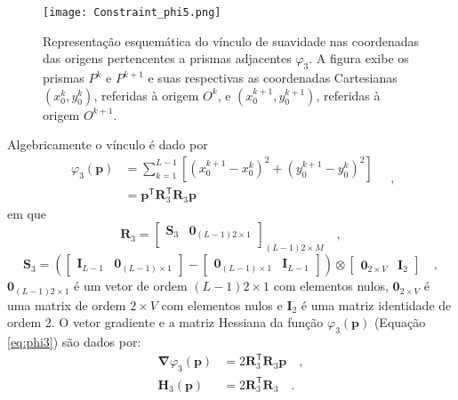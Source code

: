 \begin{figure}[!htb]
	\centering
	\texttt{[image: Constraint\_phi5.png]}
	\caption{Representação esquemática do vínculo de suavidade nas coordenadas das origens pertencentes a prismas adjacentes $\varphi_{3}$. A figura exibe os prismas $P^k$ e $P^{k+1}$ e suas respectivas as coordenadas Cartesianas $(x_0^k,y_0^k)$, referidas à origem $O^k$, e $(x_0^{k+1},y_0^{k+1})$, referidas à origem $O^{k+1}$.}
	\label{fig:phi3}
\end{figure}

Algebricamente o vínculo é dado por
\begin{equation}\label{eq:phi3}
\begin{split}
\varphi_{3}(\mathbf{p}) &= \sum\limits^{L-1}_{k=1}\left[\left(x_{0}^{k+1} - x_{0}^{k}\right)^2 + \left(y_{0}^{k+1} - y_{0}^{k}\right)^2 \right] \\
&= \mathbf{p}^{\mathsf{T}} \mathbf{R}^{\mathsf{T}}_{3}\mathbf{R}_{3}\mathbf{p}
\end{split} \quad ,
\end{equation}
em que 
\begin{equation}
\mathbf{R}_{3} = 
\begin{bmatrix}
\mathbf{S}_{3} & \mathbf{0}_{(L-1)2 \times 1} \\
\end{bmatrix}_{(L-1)2 \times M} \quad ,
\label{eq:R3-matrix}
\end{equation}
\begin{equation}
\mathbf{S}_{3} =
\left( 
\begin{bmatrix} \mathbf{I}_{L-1} & \mathbf{0}_{(L-1) \times 1} \end{bmatrix} -
\begin{bmatrix} \mathbf{0}_{(L-1) \times 1} & \mathbf{I}_{L-1} \end{bmatrix} 
\right) \otimes 
\begin{bmatrix} \mathbf{0}_{2 \times V} & \mathbf{I}_{2} \end{bmatrix} \quad ,
\label{eq:S3-matrix}
\end{equation}
$\mathbf{0}_{(L-1)2 \times 1}$ é um vetor de ordem $(L-1)2 \times 1$ com elementos nulos,
$\mathbf{0}_{2 \times V}$ é uma matrix de ordem $2 \times V$ com elementos nulos e 
$\mathbf{I}_{2}$ é uma matriz identidade de ordem $2$. O vetor gradiente e a matriz Hessiana da função $\varphi_{3}(\mathbf{p})$ (Equação \ref{eq:phi3}) são dados por:
\begin{equation}\label{eq:phi3_gh}
\begin{split}
\boldsymbol{\nabla}\varphi_{3}(\mathbf{p}) &= 2\mathbf{R}^\mathsf{T}_{3}\mathbf{R}_{3}\mathbf{p} \quad ,\\
\mathbf{H}_{3}(\mathbf{p}) &= 2\mathbf{R}^\mathsf{T}_{3}\mathbf{R}_{3} \quad .
\end{split}
\end{equation}

